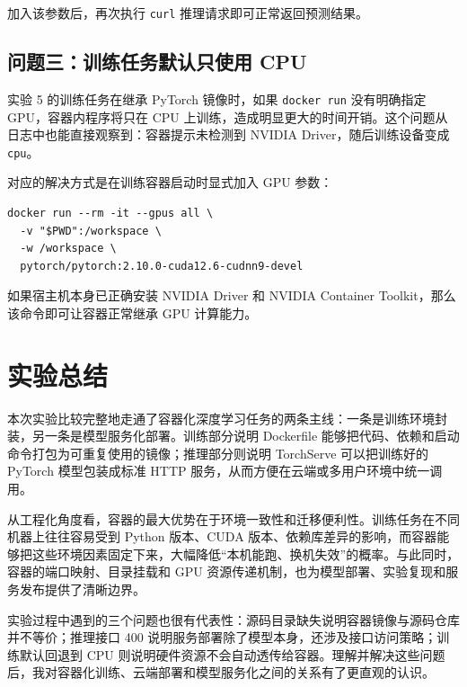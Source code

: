 \documentclass{article}
\begin{document}
加入该参数后，再次执行 \texttt{curl} 推理请求即可正常返回预测结果。

\subsection{问题三：训练任务默认只使用 CPU}
实验 5 的训练任务在继承 PyTorch 镜像时，如果 \texttt{docker run} 没有明确指定 GPU，容器内程序将只在 CPU 上训练，造成明显更大的时间开销。这个问题从日志中也能直接观察到：容器提示未检测到 NVIDIA Driver，随后训练设备变成 \texttt{cpu}。

对应的解决方式是在训练容器启动时显式加入 GPU 参数：

\begin{lstlisting}[caption={训练任务显式启用 GPU},label={lst:gpu_enable}]
docker run --rm -it --gpus all \
  -v "$PWD":/workspace \
  -w /workspace \
  pytorch/pytorch:2.10.0-cuda12.6-cudnn9-devel
\end{lstlisting}

如果宿主机本身已正确安装 NVIDIA Driver 和 NVIDIA Container Toolkit，那么该命令即可让容器正常继承 GPU 计算能力。

\section{实验总结}
本次实验比较完整地走通了容器化深度学习任务的两条主线：一条是训练环境封装，另一条是模型服务化部署。训练部分说明 Dockerfile 能够把代码、依赖和启动命令打包为可重复使用的镜像；推理部分则说明 TorchServe 可以把训练好的 PyTorch 模型包装成标准 HTTP 服务，从而方便在云端或多用户环境中统一调用。

从工程化角度看，容器的最大优势在于环境一致性和迁移便利性。训练任务在不同机器上往往容易受到 Python 版本、CUDA 版本、依赖库差异的影响，而容器能够把这些环境因素固定下来，大幅降低“本机能跑、换机失效”的概率。与此同时，容器的端口映射、目录挂载和 GPU 资源传递机制，也为模型部署、实验复现和服务发布提供了清晰边界。

实验过程中遇到的三个问题也很有代表性：源码目录缺失说明容器镜像与源码仓库并不等价；推理接口 400 说明服务部署除了模型本身，还涉及接口访问策略；训练默认回退到 CPU 则说明硬件资源不会自动透传给容器。理解并解决这些问题后，我对容器化训练、云端部署和模型服务化之间的关系有了更直观的认识。
\end{document}
